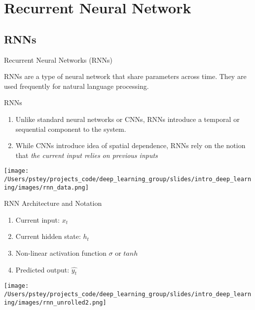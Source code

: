 \documentclass[pdf]{beamer}
\begin{document}
	
	
	
	
\section{Recurrent Neural Network}

\subsection{RNNs}

	\begin{frame}{Recurrent Neural Networks (RNNs)}
	
	\begin{center}
		RNNs are a type of neural network that share parameters across time. They are used frequently for natural language processing.
	\end{center}
	\end{frame}

	\begin{frame}{RNNs}
	\begin{enumerate}
		\item Unlike standard neural networks or CNNs, RNNs introduce a temporal or sequential component to the system.
		\item While CNNs introduce idea of spatial dependence, RNNs rely on the notion that \textit{the current input relies on previous inputs} 
	\end{enumerate}
	\begin{center}
		\texttt{[image: /Users/pstey/projects\_code/deep\_learning\_group/slides/intro\_deep\_learning/images/rnn\_data.png]}
	\end{center}
	\end{frame}


	\begin{frame}{RNN Architecture and Notation}
	\begin{enumerate}
		\item Current input: $x_t$
		\item Current hidden state: $h_t$
		\item Non-linear activation function $\sigma$ or $tanh$
		\item Predicted output: $\widehat{y_t}$
	\end{enumerate}
	
	\begin{center}
		\texttt{[image: /Users/pstey/projects\_code/deep\_learning\_group/slides/intro\_deep\_learning/images/rnn\_unrolled2.png]}
	\end{center}
	\end{frame}
	
\end{document}
